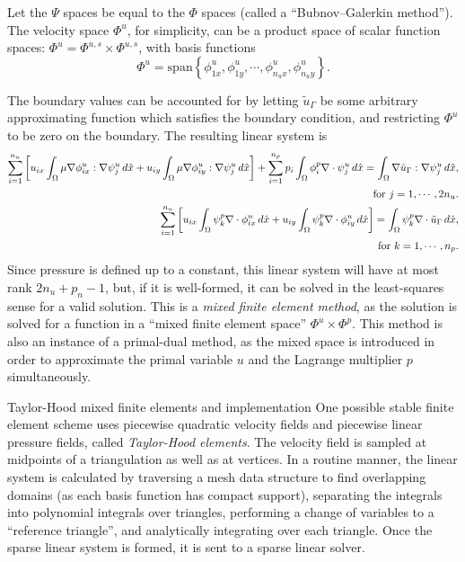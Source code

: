 \documentclass{article}
\begin{document}
Let the $\Psi$ spaces be equal to the $\Phi$ spaces (called a ``Bubnov--Galerkin method'').
The velocity space $\Phi^u$, for simplicity, can be a product space of scalar function spaces: $\Phi^u = \Phi^{u,s} \times \Phi^{u,s}$,
with basis functions
    $$\Phi^u = \text{span}\left\{\phi^u_{1x},\phi^u_{1y},\cdots,\phi^u_{n_ux},\phi^u_{n_uy}\right\}.$$

The boundary values can be accounted for by letting $\tilde{u}_\Gamma$ be some arbitrary approximating function which satisfies the boundary condition,
and restricting $\Phi^u$ to be zero on the boundary. The resulting linear system is
\begin{equation}
\begin{split}
    \sum_{i=1}^{n_u}\left[
        u_{ix}\int_\Omega\mu\nabla\phi_{ix}^u:\nabla\psi_j^u\,d\hat{x}
        +
        u_{iy}\int_\Omega\mu\nabla\phi_{iy}^u:\nabla\psi_j^u\,d\hat{x}
    \right]
    +
    \sum_{i=1}^{n_p} p_i\int_\Omega \phi_i^p\nabla\cdot\psi^u_j\,d\hat{x}
    =
    \int_\Omega\nabla\tilde{u}_\Gamma:\nabla\psi_j^u\,d\hat{x},\\
    \text{\quad for $j=1,\cdots,2n_u$}.\\
    \sum_{i=1}^{n_u}\left[
        u_{ix}\int_\Omega\psi_k^p\nabla\cdot\phi_{ix}^u\,d\hat{x}
        +
        u_{iy}\int_\Omega\psi_k^p\nabla\cdot\phi_{iy}^u\,d\hat{x}
    \right]
    =
    \int_\Omega\psi_k^p\nabla\cdot\tilde{u}_\Gamma\,d\hat{x},\\
    \text{\quad for $k=1,\cdots,n_p$}.\\
\end{split}
\end{equation}
Since pressure is defined up to a constant, this linear system will have at most rank $2n_u + p_n - 1$,
but, if it is well-formed, it can be solved in the least-squares sense for a valid solution.
This is a \textit{mixed finite element method}, as the solution is solved for a function in a ``mixed finite element space'' $\Phi^u \times \Phi^p$.
This method is also an instance of a primal-dual method, as the mixed space is introduced in order to approximate the primal variable $u$
and the Lagrange multiplier $p$ simultaneously.


\newpage
\vskip 0.2in
{\large Taylor-Hood mixed finite elements and implementation}
\vskip 0.2in
One possible stable finite element scheme uses piecewise quadratic velocity fields
and piecewise linear pressure fields, called \textit{Taylor-Hood elements}.
The velocity field is sampled at midpoints of a triangulation as well as at vertices.
In a routine manner, the linear system is calculated by traversing a mesh data structure to find
overlapping domains (as each basis function has compact support), separating the integrals into polynomial integrals over triangles,
performing a change of variables to a ``reference triangle'', and analytically integrating over each triangle.
Once the sparse linear system is formed, it is sent to a sparse linear solver.
\end{document}
